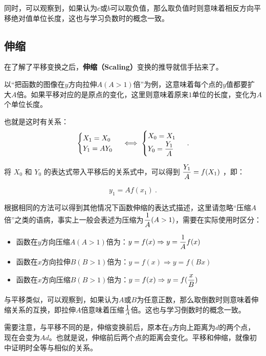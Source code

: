 同时，可以观察到，如果认为$c$或$b$可以取负值，那么取负值时则意味着相反方向平移绝对值单位长度，这也与学习负数时的概念一致。

\subsection{伸缩}

在了解了平移变换之后，\textbf{伸缩（Scaling）}变换的推导就信手拈来了。

以“把函数的图像在$y$方向拉伸$A(A>1)$倍”为例，这意味着每个点的$y$值都要扩大$A$倍。如果平移对应的是原点的变化，这里则意味着原来$1$单位的长度，变化为$A$个单位长度。

也就是这时有关系：
\begin{equation}
\begin{cases}
X_1=X_0\\
Y_1=AY_0
\end{cases}\iff
\begin{cases}
X_0=X_1\\
\displaystyle Y_0={Y_1\over A}
\end{cases}~.
\end{equation}

将  $X_0$  和  $Y_0$  的表达式带入平移后的关系式中，可以得到  $\displaystyle{Y_1\over A} = f(X_1 )$ ，即：

\begin{equation}
y_1=Af(x_1)~.
\end{equation}

根据相同的方法可以得到其他情况下函数伸缩的表达式描述，这里请忽略“压缩$A$倍”之类的语病，事实上一般会表述为压缩为$\displaystyle{1\over A}(A>1)$，需要在实际使用时区分：

\begin{itemize}
\item 函数在$y$方向压缩$A(A>1)$倍为：$\displaystyle y=f(x)\Rightarrow y={1\over A}f(x)$
\item 函数在$x$方向拉伸$B(B>1)$倍为：$y=f(x)\Rightarrow y=f(Bx)$
\item 函数在$x$方向压缩$B(B>1)$倍为：$\displaystyle y=f(x)\Rightarrow y=f({x\over B})$
\end{itemize}

与平移类似，可以观察到，如果认为$A$或$B$为任意正数，那么取倒数时则意味着伸缩关系的互换，即拉伸$A$倍意味着压缩$\displaystyle 1\over A$倍。这也与学习倒数时的概念一致。

需要注意，与平移不同的是，伸缩变换前后，原本在$y$方向上距离为$d$的两个点，现在会变为$Ad$。也就是说，伸缩前后两个点的距离会变化。平移和伸缩，就像初中证明时全等与相似的关系。

